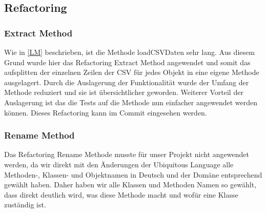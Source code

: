 \subsection{Refactoring}
\subsubsection{Extract Method}
Wie in \autoref{LM} beschrieben, ist die Methode loadCSVDaten sehr lang. Aus diesem Grund wurde hier das Refactoring Extract Method angewendet und somit das aufsplitten der einzelnen Zeilen der CSV für jedes Objekt in eine eigene Methode ausgelagert.
Durch die Auslagerung der Funktionalität wurde der Umfang der Methode reduziert und sie ist übersichtlicher geworden. 
Weiterer Vorteil der Auslagerung ist das die Tests auf die Methode nun einfacher angewendet werden können. 
Dieses Refactoring kann im Commit \href{https://github.com/MichaelaHaag/RezeptApp/commit/d3ace6a38e46831cee35d0b270c41c4fd5783162}{} eingesehen werden.
\subsubsection{Rename Method}
Das Refactoring Rename Methode musste für unser Projekt nicht angewendet werden, da wir direkt mit den Änderungen der Ubiquitous Language alle Methoden-, Klassen- und Objektnamen in Deutsch und der Domäne entsprechend gewählt haben. Daher haben wir alle Klassen und Methoden Namen so gewählt, dass direkt deutlich wird, was diese Methode macht und wofür eine Klasse zuständig ist.
